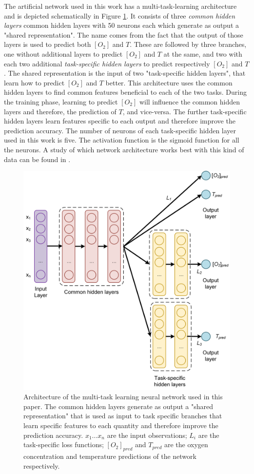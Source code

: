 \documentclass[9pt,twocolumn,twoside,pdftex]{optica}
\begin{document}
The artificial network used in this work has a multi-task-learning architecture and is depicted schematically in Figure \ref{fig:NN_MTL_O2_T}. It consists of three {\sl common hidden layers} common hidden layers with 50 neurons each which generate as output a "shared representation". The name comes from the fact that the output of those layers is used to predict both $[O_2]$ and $T$. These are followed by three branches, one without additional layers to predict $[O_2]$ and $T$ at the same, and two with each two additional {\sl task-specific hidden layers} to predict respectively $[O_2]$ and $T$. The shared representation is the input of two "task-specific hidden layers", that learn how to predict $[O_2]$ and $T$ better. This architecture uses the common hidden layers to find common features beneficial to each of the two tasks. During the training phase, learning to predict $[O_2]$ will influence the common hidden layers and therefore, the prediction of $T$, and vice-versa. The further task-specific hidden layers learn features specific to each output and therefore improve the prediction accuracy. The number of neurons of each task-specific hidden layer used in this work is five. The activation function is the sigmoid function for all the neurons.  A study of which network architecture works best with this kind of data can be found in \cite{Michelucci2019_2}.

\begin{figure}[t!]
\centering
\includegraphics[width=8.7 cm]{NN_MTL_O2_T.png}
\caption{Architecture of the multi-task learning neural network used in this paper. The common hidden layers generate as output a "shared representation" that is used as input to task specific branches that learn specific features to each quantity and therefore improve the prediction accuracy. $x_1 ... x_n$ are the input observations; $L_i$ are the task-specific loss functions; $[O_2]_{pred}$ and $T_{pred}$ are the oxygen concentration and temperature predictions of the network respectively.} 
\label{fig:NN_MTL_O2_T}
\end{figure}
\end{document}
